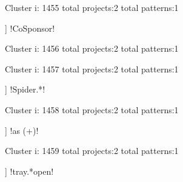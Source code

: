 Cluster i: 1455
total projects:2
total patterns:1
\begin{multicols}{1}
\begin{description}[noitemsep,topsep=0pt]
\item [[2] ] \cverb!CoSponsor!
\end{description}
\end{multicols}







Cluster i: 1456
total projects:2
total patterns:1
\begin{multicols}{1}
\begin{description}[noitemsep,topsep=0pt]
\item [[2] ] \cverb!^[\d ]+$!
\end{description}
\end{multicols}







Cluster i: 1457
total projects:2
total patterns:1
\begin{multicols}{1}
\begin{description}[noitemsep,topsep=0pt]
\item [[2] ] \cverb!Spider.*!
\end{description}
\end{multicols}







Cluster i: 1458
total projects:2
total patterns:1
\begin{multicols}{1}
\begin{description}[noitemsep,topsep=0pt]
\item [[2] ] \cverb!as (\w+)!
\end{description}
\end{multicols}







Cluster i: 1459
total projects:2
total patterns:1
\begin{multicols}{1}
\begin{description}[noitemsep,topsep=0pt]
\item [[2] ] \cverb!tray.*open!
\end{description}
\end{multicols}







